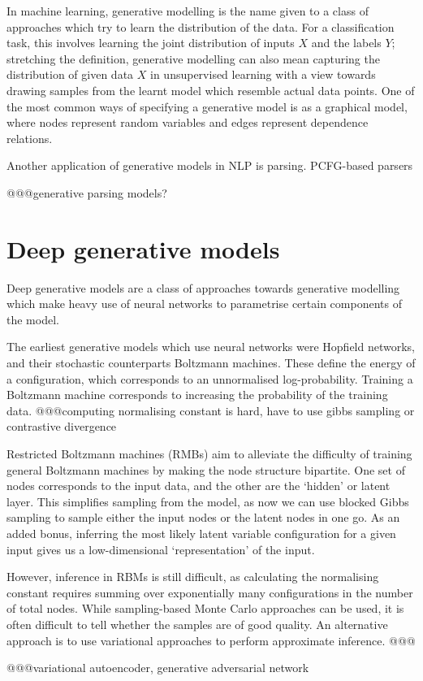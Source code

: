 In machine learning, generative modelling is the name given to a class of approaches which try to learn the distribution of the data. For a classification task, this involves learning the joint distribution of inputs $X$ and the labels $Y$; stretching the definition, generative modelling can also mean capturing the distribution of given data $X$ in unsupervised learning with a view towards drawing samples from the learnt model which resemble actual data points. One of the most common ways of specifying a generative model is as a graphical model, where nodes represent random variables and edges represent dependence relations.

Another application of generative models in NLP is parsing. PCFG-based parsers

@@@generative parsing models?

\section{Deep generative models}

Deep generative models are a class of approaches towards generative modelling which make heavy use of neural networks to parametrise certain components of the model. 

The earliest generative models which use neural networks were Hopfield networks, and their stochastic counterparts Boltzmann machines. These define the energy of a configuration, which corresponds to an unnormalised log-probability. Training a Boltzmann machine corresponds to increasing the probability of the training data. @@@computing normalising constant is hard, have to use gibbs sampling or contrastive divergence

Restricted Boltzmann machines (RMBs) aim to alleviate the difficulty of training general Boltzmann machines by making the node structure bipartite. One set of nodes corresponds to the input data, and the other are the `hidden' or latent layer. This simplifies sampling from the model, as now we can use blocked Gibbs sampling to sample either the input nodes or the latent nodes in one go. As an added bonus, inferring the most likely latent variable configuration for a given input gives us a low-dimensional `representation' of the input.

However, inference in RBMs is still difficult, as calculating the normalising constant requires summing over exponentially many configurations in the number of total nodes. While sampling-based Monte Carlo approaches can be used, it is often difficult to tell whether the samples are of good quality. An alternative approach is to use variational approaches to perform approximate inference. @@@

@@@variational autoencoder, generative adversarial network